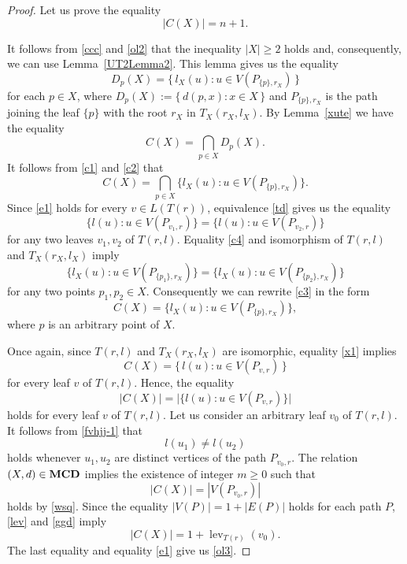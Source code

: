 \documentclass{raex}
\theoremstyle{definition}
\theoremstyle{remark}
\numberwithin{equation}{section}
\begin{document}
\begin{proof}
Let us prove the equality
\begin{equation}
\label{ol3}
|C(X)|=n+1.
\end{equation}


It follows from \eqref{ccc} and \eqref{ol2}
that the inequality \(|X|\ge2\) holds and,
consequently, we can use
Lemma~\ref{UT2Lemma2}. This
lemma gives us the equality
\begin{equation}
    \label{c1}
D_p(X)=\{\,l_X(u):u\in V(P_{\{p\},r_X})\,\}
\end{equation}
for each \(p\in X\), where
\(
D_p(X):=\{\,d(p,x):x\in X\,\}
\)
and \(P_{\{p\},r_X}\) is the path joining the leaf \(\{p\}\) with the root
\(r_X\) in \(T_X(r_X,l_X)\).
By Lemma~\ref{xute} we have the equality
\begin{equation}
    \label{c2}
C(X)=\bigcap_{p\in X} D_p(X).
\end{equation}
It follows from \eqref{c1} and \eqref{c2} that
\begin{equation}\label{c3}
C(X)=\bigcap_{p\in X} \{l_X(u): u\in V(P_{\{p\},r_X})\}.
\end{equation}
Since \eqref{e1} holds for every $v\in L(T(r))$, equivalence \eqref{td} gives us the equality
\begin{equation}
    \label{c4}
\{l(u):u\in V(P_{v_1,r})\}
=
\{l(u):u\in V(P_{v_2,r})\}
\end{equation}
for any two leaves \(v_1,v_2\) of \(T(r,l)\). 
Equality  \eqref{c4} and isomorphism of \(T(r,l)\) and \(T_X(r_{X},l_X)\) imply  
\[
\{l_X(u):u\in V(P_{\{p_1\},r_X})\}
=
\{l_X(u):u\in V(P_{\{p_2\},r_X})\}
\]
for any two points \(p_1,p_2\in X\).
Consequently we can rewrite \eqref{c3} in the form
\begin{equation}
    \label{x1}
C(X)=\{l_X(u):u\in V(P_{\{p\},r_X})\},
\end{equation}
where \(p\) is an arbitrary point of \(X\).



Once again, since 
\(T(r,l)\) and \(T_X(r_X,l_X)\) are isomorphic, equality \eqref{x1} implies
\[
C(X)=\{\,l(u): u\in V(P_{v,r})\,\}
\]
for every leaf \(v\) of \(T(r,l)\).
Hence, the equality
\begin{equation}\label{wsq}
|C(X)|=\bigl|\{l(u):u\in V(P_{v,r})\}\bigr|
\end{equation}
holds for every leaf \(v\) of \(T(r,l)\). Let us consider an arbitrary leaf $v_0$ of $T(r,l)$.
It follows from \eqref{fvhjj-1} that
\[
l(u_1)\neq l(u_2)
\]
holds whenever \(u_1,u_2\) are distinct vertices of the path
\(P_{v_0,r}\). The relation $(X,d)\in {\bf MCD}$ implies the existence of integer $m\geq 0$ such that
\begin{equation}\label{ggd}
|C(X)|=|V(P_{v_0,r})|
\end{equation}
holds by \eqref{wsq}.
Since the equality
\(
|V(P)|=1+|E(P)|
\)
holds for each path $P$, \eqref{lev} and \eqref{ggd} imply
\[
|C(X)|=1+\operatorname{lev}_{T(r)}(v_0).
\]
The last equality and equality \eqref{e1} give
us \eqref{ol3}.


\end{proof}
\end{document}
